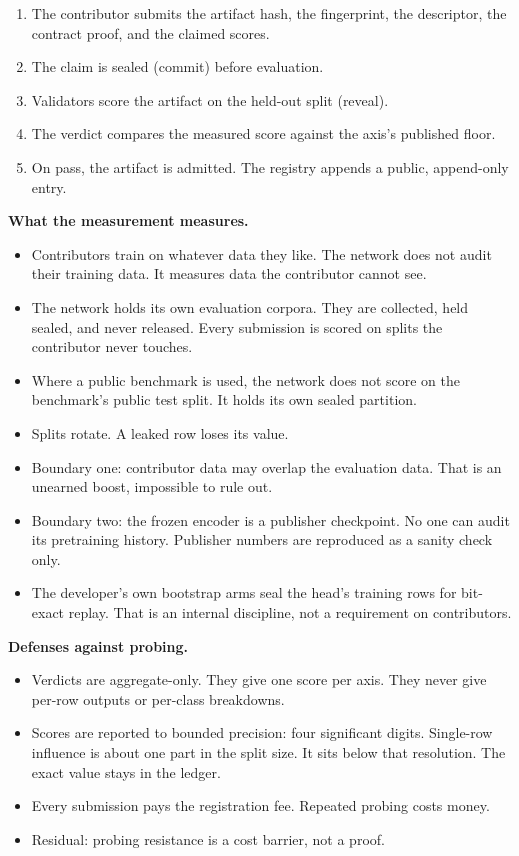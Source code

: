 \documentclass[11pt]{article}
\begin{document}
\begin{enumerate}
\item The contributor submits the artifact hash, the fingerprint,
the descriptor, the contract proof, and the claimed scores.
\item The claim is sealed (commit) before evaluation.
\item Validators score the artifact on the held-out split
(reveal).
\item The verdict compares the measured score against the axis's
published floor.
\item On pass, the artifact is admitted. The registry appends a
public, append-only entry.
\end{enumerate}

\textbf{What the measurement measures.}
\begin{itemize}
\item Contributors train on whatever data they like. The network
does not audit their training data. It measures data the
contributor cannot see.
\item The network holds its own evaluation corpora. They are
collected, held sealed, and never released. Every submission is
scored on splits the contributor never touches.
\item Where a public benchmark is used, the network does not
score on the benchmark's public test split. It holds its own
sealed partition.
\item Splits rotate. A leaked row loses its value.
\item Boundary one: contributor data may overlap the evaluation
data. That is an unearned boost, impossible to rule out.
\item Boundary two: the frozen encoder is a publisher checkpoint.
No one can audit its pretraining history. Publisher numbers are
reproduced as a sanity check only.
\item The developer's own bootstrap arms seal the head's training
rows for bit-exact replay. That is an internal discipline, not a
requirement on contributors.
\end{itemize}

\textbf{Defenses against probing.}
\begin{itemize}
\item Verdicts are aggregate-only. They give one score per axis.
They never give per-row outputs or per-class breakdowns.
\item Scores are reported to bounded precision: four significant
digits. Single-row influence is about one part in the split size.
It sits below that resolution. The exact value stays in the
ledger.
\item Every submission pays the registration fee. Repeated
probing costs money.
\item Residual: probing resistance is a cost barrier, not a
proof.
\end{itemize}
\end{document}

